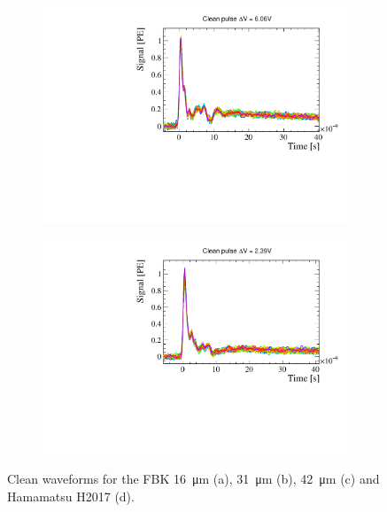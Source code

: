 \begin{figure}[htbp]
\begin{subfigure}{0.48\textwidth}
        \caption{}
      \end{subfigure}
      \hfill
       \begin{subfigure}{0.48\textwidth}
        \includegraphics[width=1\linewidth]{gfx/plots/WA/42/clwf42.pdf}
        \caption{}
      \end{subfigure}
      \hfill
       \begin{subfigure}{0.48\textwidth}
        \includegraphics[width=1\linewidth]{gfx/plots/WA/H2017/clwfh2017.pdf}
        \caption{}
      \end{subfigure}
    \caption{Clean waveforms for the FBK \SI{16}{\micro m} (a), \SI{31}{\micro m} (b), \SI{42}{\micro m} (c) and Hamamatsu H2017 (d).}
    \label{fig:pulse shape clean waveforms}
\end{figure}

